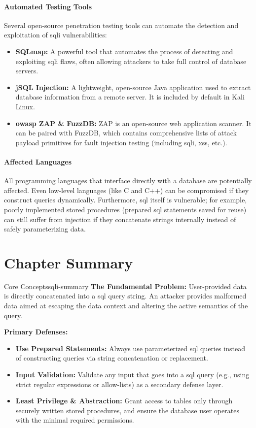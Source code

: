\paragraph{Automated Testing Tools}
Several open-source penetration testing tools can automate the detection and exploitation of \gls{sqli} vulnerabilities:
\begin{itemize}
    \item \textbf{SQLmap:} A powerful tool that automates the process of detecting and exploiting \gls{sqli} flaws, often allowing attackers to take full control of database servers.
    \item \textbf{jSQL Injection:} A lightweight, open-source Java application used to extract database information from a remote server. It is included by default in Kali Linux.
    \item \textbf{\gls{owasp} ZAP \& FuzzDB:} ZAP is an open-source web application scanner. It can be paired with FuzzDB, which contains comprehensive lists of attack payload primitives for fault injection testing (including \gls{sqli}, \gls{xss}, etc.).
\end{itemize}

\paragraph{Affected Languages}
All programming languages that interface directly with a database are potentially affected. Even low-level languages (like C and C++) can be compromised if they construct queries dynamically. Furthermore, \gls{sql} itself is vulnerable; for example, poorly implemented stored procedures (prepared \gls{sql} statements saved for reuse) can still suffer from injection if they concatenate strings internally instead of safely parameterizing data.

\section{Chapter Summary}

\begin{concept}{Core  Concepts}{sqli-summary}
    \textbf{The Fundamental Problem:} User-provided data is directly concatenated into a \gls{sql} query string. An attacker provides malformed data aimed at escaping the data context and altering the active semantics of the query.
    
    \textbf{Primary Defenses:}
    \begin{itemize}
        \item \textbf{Use Prepared Statements:} Always use parameterized \gls{sql} queries instead of constructing queries via string concatenation or replacement.
        \item \textbf{Input Validation:} Validate any input that goes into a \gls{sql} query (e.g., using strict regular expressions or allow-lists) as a secondary defense layer.
        \item \textbf{Least Privilege \& Abstraction:} Grant access to tables only through securely written stored procedures, and ensure the database user operates with the minimal required permissions.
    \end{itemize}
\end{concept}